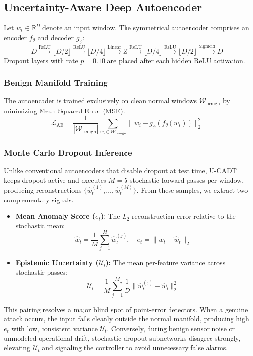 \documentclass[conference]{IEEEtran}
\begin{document}
\subsection{Uncertainty-Aware Deep Autoencoder}
Let $w_t \in \mathbb{R}^D$ denote an input window. The symmetrical autoencoder comprises an encoder $f_\theta$ and decoder $g_\phi$:
\begin{equation}
D \xrightarrow{\text{ReLU}} \lfloor D/2 \rfloor \xrightarrow{\text{ReLU}} \lfloor D/4 \rfloor \xrightarrow{\text{Linear}} Z \xrightarrow{\text{ReLU}} \lfloor D/4 \rfloor \xrightarrow{\text{ReLU}} \lfloor D/2 \rfloor \xrightarrow{\text{Sigmoid}} D
\end{equation}
Dropout layers with rate $p = 0.10$ are placed after each hidden ReLU activation.

\subsubsection{Benign Manifold Training}
The autoencoder is trained exclusively on clean normal windows $\mathcal{W}_{\text{benign}}$ by minimizing Mean Squared Error (MSE):
\begin{equation}
\mathcal{L}_{\text{AE}} = \frac{1}{|\mathcal{W}_{\text{benign}}|} \sum_{w_i \in \mathcal{W}_{\text{benign}}} \| w_i - g_\phi(f_\theta(w_i)) \|_2^2
\end{equation}

\subsubsection{Monte Carlo Dropout Inference}
Unlike conventional autoencoders that disable dropout at test time, U-CADT keeps dropout active and executes $M = 5$ stochastic forward passes per window, producing reconstructions $\{\hat{w}_t^{(1)}, \dots, \hat{w}_t^{(M)}\}$. From these samples, we extract two complementary signals:
\begin{itemize}
    \item \textbf{Mean Anomaly Score ($e_t$):} The $L_2$ reconstruction error relative to the stochastic mean:
    \begin{equation}
    \bar{\hat{w}}_t = \frac{1}{M} \sum_{j=1}^M \hat{w}_t^{(j)}, \quad e_t = \| w_t - \bar{\hat{w}}_t \|_2
    \end{equation}
    \item \textbf{Epistemic Uncertainty ($\mathcal{U}_t$):} The mean per-feature variance across stochastic passes:
    \begin{equation}
    \mathcal{U}_t = \frac{1}{M} \sum_{j=1}^M \frac{1}{D} \| \hat{w}_t^{(j)} - \bar{\hat{w}}_t \|_2^2
    \end{equation}
\end{itemize}
This pairing resolves a major blind spot of point-error detectors. When a genuine attack occurs, the input falls cleanly outside the normal manifold, producing high $e_t$ with low, consistent variance $\mathcal{U}_t$. Conversely, during benign sensor noise or unmodeled operational drift, stochastic dropout subnetworks disagree strongly, elevating $\mathcal{U}_t$ and signaling the controller to avoid unnecessary false alarms.
\end{document}
